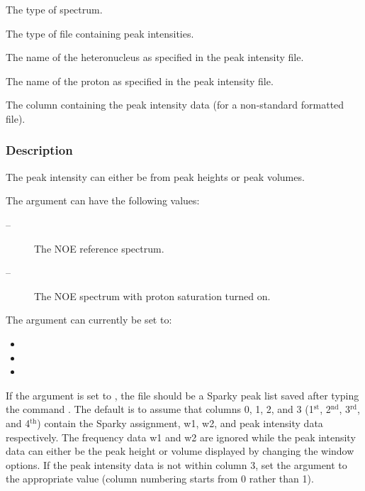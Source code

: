    The type of spectrum.   

   The type of file containing peak intensities.   

   The name of the heteronucleus as specified in the peak intensity file.   

   The name of the proton as specified in the peak intensity file.   

   The column containing the peak intensity data (for a non-standard formatted file).  

  

  
 \subsubsection{Description} 

 The peak intensity can either be from peak heights or peak volumes. 
  

 The  argument can have the following values: 
  

 \begin{description} 
 \item[ --]  The NOE reference spectrum.  
 \item[ --]  The NOE spectrum with proton saturation turned on.  
 \end{description} 
  

 The  argument can currently be set to: 
  

 \begin{itemize} 
 \item[]   
 \item[]   
 \item[]  
 \end{itemize} 
  

 If the  argument is set to , the file should be a Sparky peak list saved after typing the command .  The default is to assume that columns 0, 1, 2, and 3 (1$^\mathrm{st}$, 2$^\mathrm{nd}$, 3$^\mathrm{rd}$, and 4$^\mathrm{th}$) contain the Sparky assignment, w1, w2, and peak intensity data respectively.  The frequency data w1 and w2 are ignored while the peak intensity data can either be the peak height or volume displayed by changing the window options.  If the peak intensity data is not within column 3, set the argument  to the appropriate value (column numbering starts from 0 rather than 1). 
  

